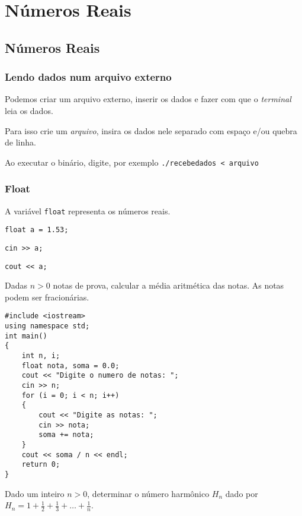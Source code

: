 \documentclass[a4paper]{memoir}
\begin{document}
\part{Números Reais}

\chapter{Números Reais}

\section{Lendo dados num arquivo externo}

Podemos criar um arquivo externo, inserir os dados e fazer com que o \emph{terminal} leia os dados.

Para isso crie um \emph{arquivo}, insira os dados nele separado com espaço e/ou quebra de linha.

Ao executar o binário, digite, por exemplo \verb|./recebedados < arquivo|

\section{Float}

A variável \verb|float| representa os números reais.

\begin{ex}
\verb|float a = 1.53;|

\verb|cin >> a;|

\verb|cout << a;|
\end{ex}

\begin{prob}\label{prob201.cpp}
Dadas $n > 0$ notas de prova, calcular a média aritmética das notas. As notas podem ser fracionárias.
\end{prob}

\begin{sol}
\begin{lstlisting}
#include <iostream>
using namespace std;
int main()
{
    int n, i;
    float nota, soma = 0.0;
    cout << "Digite o numero de notas: ";
    cin >> n;
    for (i = 0; i < n; i++)
    {
        cout << "Digite as notas: ";
        cin >> nota;
        soma += nota;
    }
    cout << soma / n << endl;
    return 0;
}
\end{lstlisting}
\end{sol}

\begin{prob}\label{prob202.cpp}
Dado um inteiro $n > 0$, determinar o número harmônico $H_n$ dado por $H_n = 1 + \frac{1}{2} + \frac{1}{3} + \ldots  + \frac{1}{n}$.
\end{prob}
\end{document}
